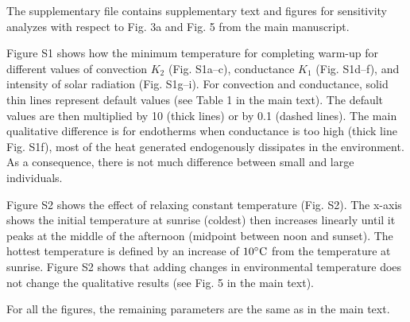 \documentclass[12pt]{article}
\date{\vspace{-5ex}}
\begin{document}
\maketitle

The supplementary file contains supplementary text and figures for sensitivity analyzes with respect to Fig. 3a and Fig. 5 from the main manuscript.

Figure S1 shows how the minimum temperature for completing warm-up for different values of convection $K_2$ (Fig. S1a--c), conductance $K_1$ (Fig. S1d--f), and intensity of solar radiation (Fig. S1g--i).
For convection and conductance, solid thin lines represent default values (see Table 1 in the main text).
The default values are then multiplied by 10 (thick lines) or by 0.1 (dashed lines).
The main qualitative difference is for endotherms when conductance is too high (thick line Fig. S1f), most of the heat generated endogenously dissipates in the environment.
As a consequence, there is not much difference between small and large individuals.

Figure S2  shows the effect of relaxing constant temperature (Fig. S2).
The x-axis shows the initial temperature at sunrise (coldest) then increases linearly until it peaks at the middle of the afternoon (midpoint between noon and sunset). The hottest temperature is defined by an increase of $10 ^{\circ}\rm{C}$ from the temperature at sunrise.
Figure S2 shows that adding changes in environmental temperature does not change the qualitative results (see Fig. 5 in the main text).

For all the figures, the remaining parameters are the same as in the main text.

\begin{figure}
	\label{figS1}
\end{figure}
\end{document}
